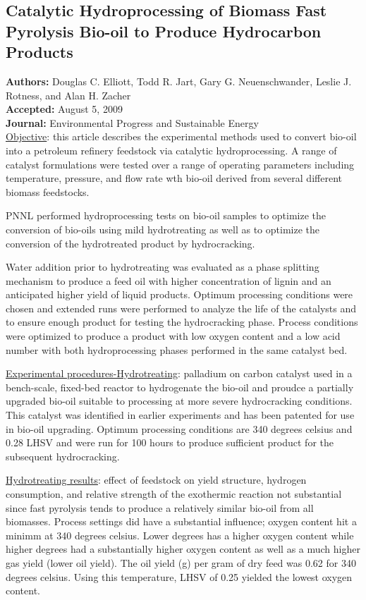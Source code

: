 \documentclass{article}\usepackage[]{graphicx}\usepackage[]{color}
\begin{document}
\subsection{Catalytic Hydroprocessing of Biomass Fast Pyrolysis Bio-oil to Produce Hydrocarbon Products}
\textbf{Authors:} Douglas C. Elliott, Todd R. Jart, Gary G. Neuenschwander, Leslie J. Rotness, and Alan H. Zacher \\
\textbf{Accepted:} August 5, 2009 \\
\textbf{Journal:} Environmental Progress and Sustainable Energy \\

\underline{Objective}: this article describes the experimental methods used to convert bio-oil into a petroleum refinery feedstock via catalytic hydroprocessing.  A range of catalyst formulations were tested over a range of operating parameters including temperature, pressure, and flow rate wth bio-oil derived from several different biomass feedstocks.

PNNL performed hydroprocessing tests on bio-oil samples to optimize the conversion of bio-oils using mild hydrotreating as well as to optimize the conversion of the hydrotreated product by hydrocracking.  

Water addition prior to hydrotreating was evaluated as a phase splitting mechanism to produce a feed oil with higher concentration of lignin and an anticipated higher yield of liquid products.  Optimum processing conditions were chosen and extended runs were performed to analyze the life of the catalysts and to ensure enough product for testing the hydrocracking phase.  Process conditions were optimized to produce a product with low oxygen content and a low acid number with both hydroprocessing phases performed in the same catalyst bed.

\underline{Experimental procedures-Hydrotreating}:  palladium on carbon catalyst used in a bench-scale, fixed-bed reactor to hydrogenate the bio-oil and proudce a partially upgraded bio-oil suitable to processing at more severe hydrocracking conditions.  This catalyst was identified in earlier experiments and has been patented for use in bio-oil upgrading.  Optimum processing conditions are 340 degrees celsius and 0.28 LHSV and were run for 100 hours to produce sufficient product for the subsequent hydrocracking.

\underline{Hydrotreating results}: effect of feedstock on yield structure, hydrogen consumption, and relative strength of the exothermic reaction not substantial since fast pyrolysis tends to produce a relatively similar bio-oil from all biomasses.  Process settings did have a substantial influence; oxygen content hit a minimm at 340 degrees celsius.  Lower degrees has a higher oxygen content while higher degrees had a substantially higher oxygen content as well as a much higher gas yield (lower oil yield).  The oil yield (g) per gram of dry feed was 0.62 for 340 degrees celsius.  Using this temperature, LHSV of 0.25 yielded the lowest oxygen content.
\end{document}
